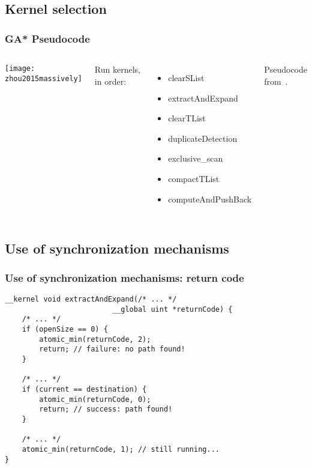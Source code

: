 \documentclass{beamer}
\begin{document}
\subsection{Kernel selection}
\begin{frame}
    \frametitle{GA* Pseudocode}
    \begin{columns}
        \texttt{[image: zhou2015massively]}
        
        Run kernels, in order:
        \begin{itemize}
            \item clearSList
            \item extractAndExpand
            \item clearTList
            \item duplicateDetection
            \item exclusive\_scan
            \item compactTList
            \item computeAndPushBack
        \end{itemize}
        
        \vspace{1em}
        Pseudocode from~\cite{zhou2015massively}.
    \end{columns}
\end{frame}

\subsection{Use of synchronization mechanisms}
\begin{frame}[fragile]
    \frametitle{Use of synchronization mechanisms: return code}
    \begin{lstlisting}
__kernel void extractAndExpand(/* ... */
                         __global uint *returnCode) {
    /* ... */
    if (openSize == 0) {
        atomic_min(returnCode, 2);
        return; // failure: no path found!
    }

    /* ... */
    if (current == destination) {
        atomic_min(returnCode, 0);
        return; // success: path found!
    }

    /* ... */
    atomic_min(returnCode, 1); // still running...
}
    \end{lstlisting}
\end{frame}
\end{document}
